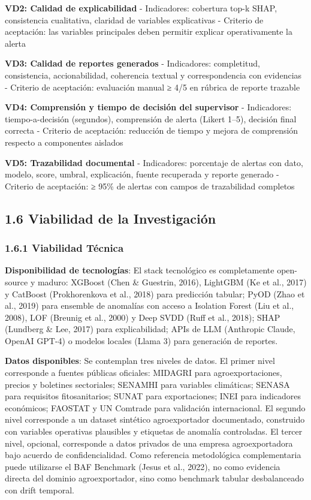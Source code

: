 \textbf{VD2: Calidad de explicabilidad} - Indicadores: cobertura top-k
SHAP, consistencia cualitativa, claridad de variables explicativas -
Criterio de aceptación: las variables principales deben permitir
explicar operativamente la alerta

\textbf{VD3: Calidad de reportes generados} - Indicadores: completitud,
consistencia, accionabilidad, coherencia textual y correspondencia con
evidencias - Criterio de aceptación: evaluación manual ≥ 4/5 en rúbrica
de reporte trazable

\textbf{VD4: Comprensión y tiempo de decisión del supervisor} -
Indicadores: tiempo-a-decisión (segundos), comprensión de alerta (Likert
1--5), decisión final correcta - Criterio de aceptación: reducción de
tiempo y mejora de comprensión respecto a componentes aislados

\textbf{VD5: Trazabilidad documental} - Indicadores: porcentaje de
alertas con dato, modelo, score, umbral, explicación, fuente recuperada
y reporte generado - Criterio de aceptación: ≥ 95\% de alertas con
campos de trazabilidad completos

\subsection{1.6 Viabilidad de la
Investigación}\label{viabilidad-de-la-investigaciuxf3n}

\subsubsection{1.6.1 Viabilidad Técnica}\label{viabilidad-tuxe9cnica}

\textbf{Disponibilidad de tecnologías}: El stack tecnológico es
completamente open-source y maduro: XGBoost (Chen \& Guestrin, 2016),
LightGBM (Ke et al., 2017) y CatBoost (Prokhorenkova et al., 2018) para
predicción tabular; PyOD (Zhao et al., 2019) para ensemble de anomalías
con acceso a Isolation Forest (Liu et al., 2008), LOF (Breunig et al.,
2000) y Deep SVDD (Ruff et al., 2018); SHAP (Lundberg \& Lee, 2017) para
explicabilidad; APIs de LLM (Anthropic Claude, OpenAI GPT-4) o modelos
locales (Llama 3) para generación de reportes.

\textbf{Datos disponibles}: Se contemplan tres niveles de datos. El
primer nivel corresponde a fuentes públicas oficiales: MIDAGRI para
agroexportaciones, precios y boletines sectoriales; SENAMHI para
variables climáticas; SENASA para requisitos fitosanitarios; SUNAT para
exportaciones; INEI para indicadores económicos; FAOSTAT y UN Comtrade
para validación internacional. El segundo nivel corresponde a un dataset
sintético agroexportador documentado, construido con variables
operativas plausibles y etiquetas de anomalía controladas. El tercer
nivel, opcional, corresponde a datos privados de una empresa
agroexportadora bajo acuerdo de confidencialidad. Como referencia
metodológica complementaria puede utilizarse el BAF Benchmark (Jesus et
al., 2022), no como evidencia directa del dominio agroexportador, sino
como benchmark tabular desbalanceado con drift temporal.


